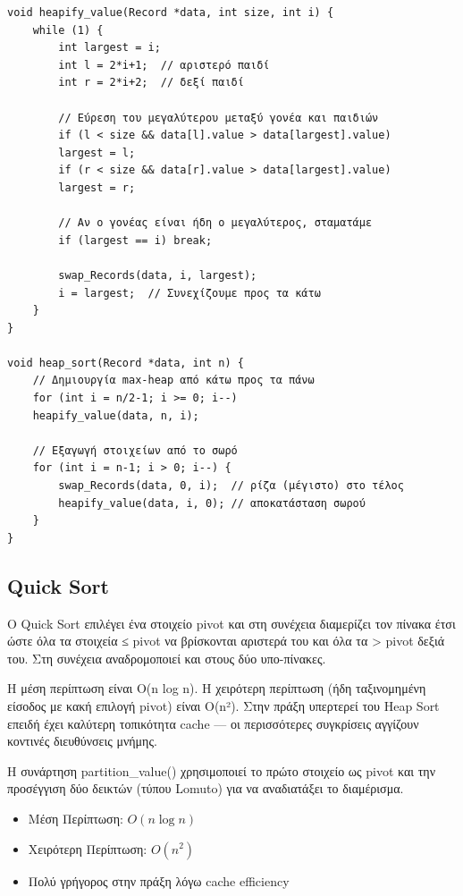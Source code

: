 \documentclass[a4paper,12pt]{article}
\begin{document}
	\begin{lstlisting}[caption=Υλοποίηση Heap Sort]
void heapify_value(Record *data, int size, int i) {
	while (1) {
		int largest = i;
		int l = 2*i+1;  // αριστερό παιδί
		int r = 2*i+2;  // δεξί παιδί
		
		// Εύρεση του μεγαλύτερου μεταξύ γονέα και παιδιών
		if (l < size && data[l].value > data[largest].value)
		largest = l;
		if (r < size && data[r].value > data[largest].value)
		largest = r;
		
		// Αν ο γονέας είναι ήδη ο μεγαλύτερος, σταματάμε
		if (largest == i) break;
		
		swap_Records(data, i, largest);
		i = largest;  // Συνεχίζουμε προς τα κάτω
	}
}

void heap_sort(Record *data, int n) {
	// Δημιουργία max-heap από κάτω προς τα πάνω
	for (int i = n/2-1; i >= 0; i--)
	heapify_value(data, n, i);
	
	// Εξαγωγή στοιχείων από το σωρό
	for (int i = n-1; i > 0; i--) {
		swap_Records(data, 0, i);  // ρίζα (μέγιστο) στο τέλος
		heapify_value(data, i, 0); // αποκατάσταση σωρού
	}
}
	\end{lstlisting}
	
	\subsection{Quick Sort}
	
	Ο Quick Sort επιλέγει ένα στοιχείο pivot και στη συνέχεια διαμερίζει τον πίνακα έτσι ώστε όλα τα στοιχεία ≤ pivot να βρίσκονται αριστερά του και όλα τα > pivot δεξιά του. Στη συνέχεια αναδρομοποιεί και στους δύο υπο-πίνακες.
	
	Η μέση περίπτωση είναι O(n log n). Η χειρότερη περίπτωση (ήδη ταξινομημένη είσοδος με κακή επιλογή pivot) είναι O(n²). Στην πράξη υπερτερεί του Heap Sort επειδή έχει καλύτερη τοπικότητα cache — οι περισσότερες συγκρίσεις αγγίζουν κοντινές διευθύνσεις μνήμης.
	
	Η συνάρτηση partition\_value() χρησιμοποιεί το πρώτο στοιχείο ως pivot και την προσέγγιση δύο δεικτών (τύπου Lomuto) για να αναδιατάξει το διαμέρισμα.
	
	\begin{itemize}
		\item Μέση Περίπτωση: $O(n \log n)$
		\item Χειρότερη Περίπτωση: $O(n^2)$
		\item Πολύ γρήγορος στην πράξη λόγω cache efficiency
	\end{itemize}
	
\end{document}
